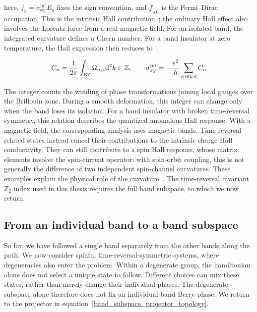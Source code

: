 here, $j_x=\sigma_{xy}^{\mathrm{int}}E_y$ fixes the sign convention,
and $f_{n\vec{k}}$ is the Fermi--Dirac occupation.
This is the intrinsic Hall contribution~\cite{nagaosa2010anomalous}; the ordinary Hall effect also involves the Lorentz force from a real magnetic field.
For an isolated band, the integrated curvature defines a Chern number.
For a band insulator at zero temperature, the Hall expression then reduces to~\cite{thouless1982quantized}:

\begin{equation}
    C_n=\frac{1}{2\mathrm{\pi}}\int_\mathrm{BZ}\Omega_{n,z}\mathrm{d}^2k\in\mathbb{Z},
    \qquad \sigma_{xy}^{\mathrm{int}}=-\frac{e^2}{h}\sum_{n\,\mathrm{filled}}C_n
\label{chern_hall_relation_appendix}
\end{equation}

The integer counts the winding of phase transformations joining local gauges over the Brillouin zone.
During a smooth deformation, this integer can change only when the band loses its isolation.
For a band insulator with broken time-reversal symmetry, this relation describes the quantized anomalous Hall response.
With a magnetic field, the corresponding analysis uses magnetic bands.
Time-reversal-related states instead cancel their contributions to the intrinsic charge Hall conductivity.
They can still contribute to a spin Hall response, whose matrix elements involve the spin-current operator;
with spin-orbit coupling, this is not generally the difference of two independent spin-channel curvatures.
These examples explain the physical role of the curvature~\cite{xiao2010berry}.
The time-reversal invariant $\mathbb{Z}_2$ index used in this thesis requires the full band subspace, to which we now return.

\FloatBarrier
\subsection{From an individual band to a band subspace}

So far, we have followed a single band separately from the other bands along the path.
We now consider spinful time-reversal-symmetric systems, where degeneracies also enter the problem.
Within a degenerate group, the hamiltonian alone does not select a unique state to follow.
Different choices can mix these states, rather than merely change their individual phases.
The degenerate subspace alone therefore does not fix an individual-band Berry phase.
We return to the projector in equation~\eqref{band_subspace_projector_topology}.

